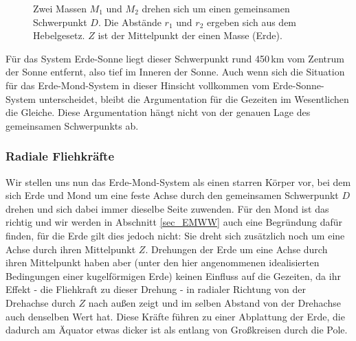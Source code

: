 \begin{figure}[htb]
%
\caption{\label{fig_Schwerpunkt}%
Zwei Massen $M_1$ und $M_2$ drehen sich um einen gemeinsamen Schwerpunkt $D$. Die
Abst\"ande $r_1$ und $r_2$ ergeben sich aus dem Hebelgesetz. $Z$ ist der Mittelpunkt der
einen Masse (Erde).}
\end{figure}

F\"ur das System Erde-Sonne liegt dieser Schwerpunkt 
rund 450\,km vom
Zentrum der Sonne entfernt, also tief im Inneren der Sonne. Auch wenn sich die Situation f\"ur
das Erde-Mond-System in dieser Hinsicht vollkommen vom Erde-Sonne-System unterscheidet, bleibt
die Argumentation f\"ur die Gezeiten im Wesentlichen die Gleiche. Diese Argumentation h\"angt nicht
von der genauen Lage des gemeinsamen Schwerpunkts ab.  

\subsubsection{Radiale Fliehkr\"afte}

Wir stellen uns nun das Erde-Mond-System als einen starren K\"orper vor, bei dem sich Erde
und Mond um eine feste Achse durch den gemeinsamen Schwerpunkt $D$ drehen und sich dabei
immer dieselbe Seite zuwenden. F\"ur den Mond ist das richtig und wir werden in
Abschnitt \ref{sec_EMWW} auch eine Begr\"undung daf\"ur finden, f\"ur die Erde gilt dies jedoch
nicht: Sie dreht sich
zus\"atzlich noch um eine Achse durch ihren Mittelpunkt $Z$. Drehungen der Erde um eine Achse
durch ihren Mittelpunkt haben aber (unter den hier angenommenen idealisierten Bedingungen einer
kugelf\"ormigen Erde) keinen Einfluss auf die Gezeiten, da ihr Effekt - die Fliehkraft zu dieser Drehung - 
in radialer Richtung von der Drehachse durch $Z$ nach au\ss en zeigt und im selben Abstand von der
Drehachse auch denselben Wert hat. Diese Kr\"afte f\"uhren zu einer Abplattung der Erde, die dadurch am 
\"Aquator etwas dicker ist als entlang von Gro\ss kreisen durch die Pole. 


